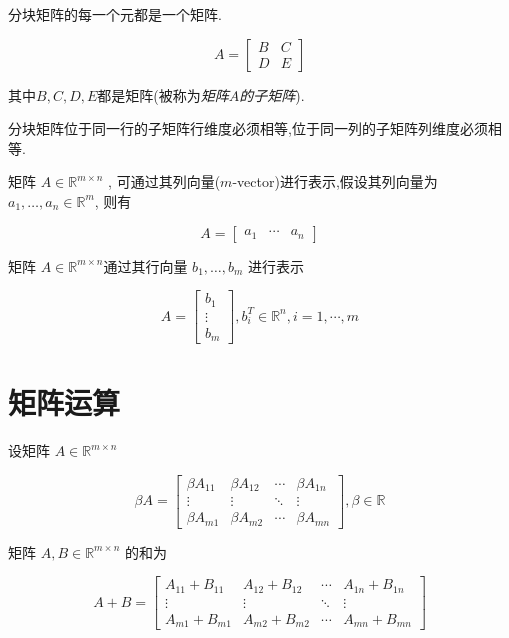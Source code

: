 \begin{definition}[分块矩阵]
    分块矩阵的每一个元都是一个矩阵.

    $$ A=\left[\begin{array}{ll}B & C \\ D & E\end{array}\right] $$

    其中$B,C,D,E$都是矩阵(被称为\textit{矩阵$A$的子矩阵}).
\end{definition}

分块矩阵位于同一行的子矩阵行维度必须相等,位于同一列的子矩阵列维度必须相等.

\begin{definition}
    矩阵 $ A \in \mathbb{R}^{m \times n} $ , 可通过其列向量($m$-vector)进行表示,假设其列向量为 $ a_{1}, \ldots, a_{n} \in \mathbb{R}^{m} $, 则有

    $$ A=\left[\begin{array}{lll}a_{1} & \cdots & a_{n}\end{array}\right] $$
\end{definition}

\begin{definition}
    矩阵 $ A \in \mathbb{R}^{m \times n} $通过其行向量 $ b_{1}, \ldots, b_{m} $ 进行表示

    $$ A=\left[\begin{array}{c}b_{1} \\ \vdots \\ b_{m}\end{array}\right], b_{i}^{T} \in \mathbb{R}^{n}, i=1, \cdots, m $$
\end{definition}

\section{矩阵运算}

\begin{definition}[矩阵数乘]
    设矩阵 $ A \in \mathbb{R}^{m \times n} $

    $$ \beta A=\left[\begin{array}{cccc}\beta A_{11} & \beta A_{12} & \cdots & \beta A_{1 n} \\ \vdots & \vdots & \ddots & \vdots \\ \beta A_{m 1} & \beta A_{m 2} & \cdots & \beta A_{m n}\end{array}\right], \beta \in \mathbb{R} $$
\end{definition}

\begin{definition}[矩阵加法]
    矩阵 $ A, B \in \mathbb{R}^{m \times n} $ 的和为

    $$ A+B=\left[\begin{array}{cccc}A_{11}+B_{11} & A_{12}+B_{12} & \cdots & A_{1 n}+B_{1 n} \\ \vdots & \vdots & \ddots & \vdots \\ A_{m 1}+B_{m 1} & A_{m 2}+B_{m 2} & \cdots & A_{m n}+B_{m n}\end{array}\right] $$
\end{definition}

